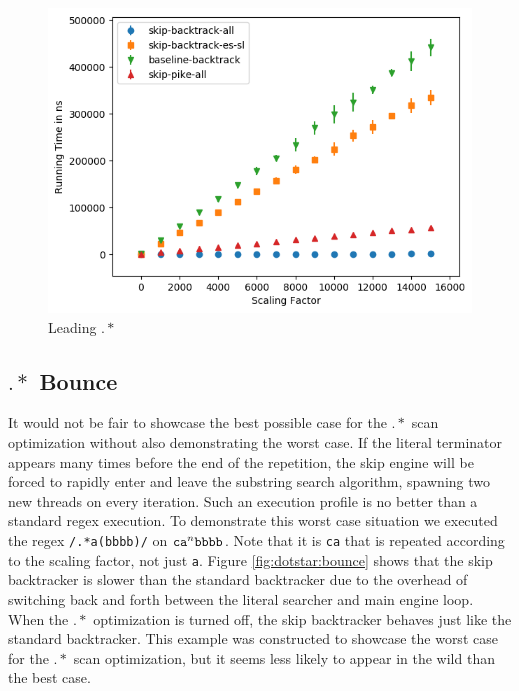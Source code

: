 \begin{figure}
\caption{Leading $.*$}
\label{fig:leading:dotstar}

\includegraphics{resources/leading-dotstar.png}
\end{figure}

\subsection{$.*$ Bounce}

It would not be fair to showcase the best possible case for the
$.*$ scan optimization without also demonstrating the worst
case. If the literal terminator appears many times before the
end of the repetition, the skip engine will be forced to
rapidly enter and leave the substring search algorithm, spawning
two new threads on every iteration. Such an execution profile
is no better than a standard regex execution.
To demonstrate this worst case situation we executed
the regex \verb'/.*a(bbbb)/' on ${\tt ca}^n{\tt bbbb}$. Note
that it is \verb'ca' that is repeated according to the scaling factor,
not just \verb'a'. Figure \ref{fig:dotstar:bounce}
shows that the skip backtracker is slower than the standard
backtracker due to the overhead of switching back and forth between the
literal searcher and main engine loop. When the $.*$ optimization is
turned off, the skip backtracker behaves just like the standard
backtracker. This example was constructed to showcase the worst
case for the $.*$ scan optimization, but it seems less likely to appear
in the wild than the best case.


